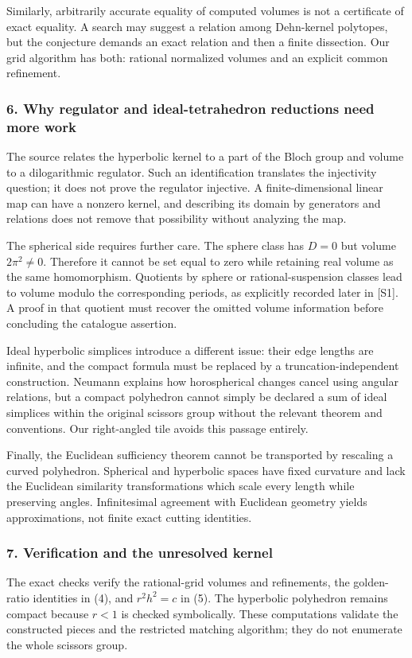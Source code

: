 \documentclass[11pt]{article}
\begin{document}
Similarly, arbitrarily accurate equality of computed volumes is not a certificate of exact equality. A search may suggest a relation among Dehn-kernel polytopes, but the conjecture demands an exact relation and then a finite dissection. Our grid algorithm has both: rational normalized volumes and an explicit common refinement.

\subsubsection{6. Why regulator and ideal-tetrahedron reductions need more work}
The source relates the hyperbolic kernel to a part of the Bloch group and volume to a dilogarithmic regulator. Such an identification translates the injectivity question; it does not prove the regulator injective. A finite-dimensional linear map can have a nonzero kernel, and describing its domain by generators and relations does not remove that possibility without analyzing the map.

The spherical side requires further care. The sphere class has $D=0$ but volume $2\pi^2\ne0$. Therefore it cannot be set equal to zero while retaining real volume as the same homomorphism. Quotients by sphere or rational-suspension classes lead to volume modulo the corresponding periods, as explicitly recorded later in [S1]. A proof in that quotient must recover the omitted volume information before concluding the catalogue assertion.

Ideal hyperbolic simplices introduce a different issue: their edge lengths are infinite, and the compact formula must be replaced by a truncation-independent construction. Neumann explains how horospherical changes cancel using angular relations, but a compact polyhedron cannot simply be declared a sum of ideal simplices within the original scissors group without the relevant theorem and conventions. Our right-angled tile avoids this passage entirely.

Finally, the Euclidean sufficiency theorem cannot be transported by rescaling a curved polyhedron. Spherical and hyperbolic spaces have fixed curvature and lack the Euclidean similarity transformations which scale every length while preserving angles. Infinitesimal agreement with Euclidean geometry yields approximations, not finite exact cutting identities.

\subsubsection{7. Verification and the unresolved kernel}
The exact checks verify the rational-grid volumes and refinements, the golden-ratio identities in (4), and $r^2h^2=c$ in (5). The hyperbolic polyhedron remains compact because $r<1$ is checked symbolically. These computations validate the constructed pieces and the restricted matching algorithm; they do not enumerate the whole scissors group.
\end{document}
